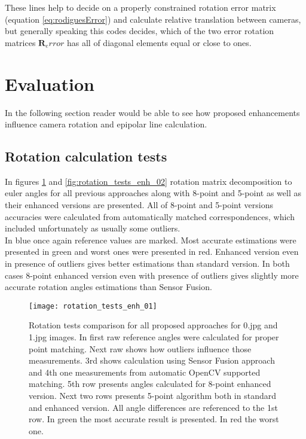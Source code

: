 These lines help to decide on a properly constrained rotation error matrix (equation \ref{eq:rodiguesError}) and calculate relative translation between cameras, but generally speaking this codes decides, which of the two error rotation matrices $\textbf{R}_error$ has all of diagonal elements equal or close to ones.
\section{Evaluation}
In the following section reader would be able to see how proposed enhancements influence camera rotation and epipolar line calculation.
\subsection{Rotation calculation tests}
In figures \ref{fig:rotation_tests_enh_01} and \ref{fig:rotation_tests_enh_02} rotation matrix decomposition to euler angles for all previous approaches along with 8-point and 5-point as well as their enhanced versions are presented. All of 8-point and 5-point versions accuracies were calculated from automatically matched correspondences, which included unfortunately as usually some outliers. \\
In blue once again reference values are marked. Most accurate estimations were presented in green and worst ones were presented in red. Enhanced version even in presence of outliers gives better estimations than standard version. In both cases 8-point enhanced version even with presence of outliers gives slightly more accurate rotation angles estimations than Sensor Fusion.
\begin{figure}[h!]
    \centering
    \texttt{[image: rotation\_tests\_enh\_01]}
    \caption[Rotation tests comparison for all proposed approaches - 1st example]{Rotation tests comparison for all proposed approaches for 0.jpg and 1.jpg images. In first raw reference angles were calculated for proper point matching. Next raw shows how outliers influence those measurements. 3rd shows calculation using Sensor Fusion approach and 4th one measurements from automatic OpenCV supported matching. 5th row presents angles calculated for 8-point enhanced version. Next two rows presents 5-point algorithm both in standard and enhanced version. All angle differences are referenced to the 1st row. In green the most accurate result is presented. In red the worst one.}
    \label{fig:rotation_tests_enh_01}
\end{figure}
